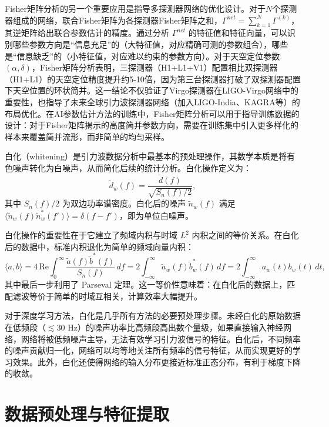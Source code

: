 Fisher矩阵分析的另一个重要应用是指导多探测器网络的优化设计。对于$N$个探测器组成的网络，联合Fisher矩阵为各探测器Fisher矩阵之和，$\Gamma^{net} = \sum_{k=1}^N \Gamma^{(k)}$，其逆矩阵给出联合参数估计的精度。通过分析 $\Gamma^{net}$ 的特征值和特征向量，可以识别哪些参数方向是“信息充足”的（大特征值，对应精确可测的参数组合），哪些是“信息缺乏”的（小特征值，对应难以约束的参数方向）。对于天空定位参数 $(\alpha, \delta)$，Fisher矩阵分析表明，三探测器（H1+L1+V1）配置相比双探测器（H1+L1）的天空定位精度提升约5-10倍，因为第三台探测器打破了双探测器配置下天空位置的环状简并。这一结论不仅验证了Virgo探测器在LIGO-Virgo网络中的重要性，也指导了未来全球引力波探测器网络（加入LIGO-India、KAGRA等）的布局优化。在AI参数估计方法的训练中，Fisher矩阵分析可以用于指导训练数据的设计：对于Fisher矩阵揭示的高度简并参数方向，需要在训练集中引入更多样化的样本来覆盖简并流形，而非简单的均匀采样。

白化（whitening）是引力波数据分析中最基本的预处理操作，其数学本质是将有色噪声转化为白噪声，从而简化后续的统计分析。白化操作定义为：
\begin{equation}
  \tilde{d}_w(f) = \frac{\tilde{d}(f)}{\sqrt{S_n(f)/2}},
\end{equation}
其中 $S_n(f)/2$ 为双边功率谱密度。白化后的噪声 $\tilde{n}_w(f)$ 满足 $\langle \tilde{n}_w(f) \tilde{n}_w^*(f') \rangle = \delta(f-f')$，即为单位白噪声。

白化操作的重要性在于它建立了频域内积与时域 $L^2$ 内积之间的等价关系。在白化后的数据中，标准内积退化为简单的频域向量内积：
\begin{equation}
  \langle a, b \rangle = 4\,\text{Re}\int_0^\infty \frac{\tilde{a}(f)\tilde{b}^*(f)}{S_n(f)}\,df = 2\int_{-\infty}^{\infty} \tilde{a}_w(f)\tilde{b}_w^*(f)\,df = 2\int_{-\infty}^{\infty} a_w(t)b_w(t)\,dt,
\end{equation}
其中最后一步利用了 Parseval 定理。这一等价性意味着：在白化后的数据上，匹配滤波等价于简单的时域互相关，计算效率大幅提升。

对于深度学习方法，白化是几乎所有方法的必要预处理步骤。未经白化的原始数据在低频段（$\lesssim 30$ Hz）的噪声功率比高频段高出数个量级，如果直接输入神经网络，网络将被低频噪声主导，无法有效学习引力波信号的特征。白化后，不同频率的噪声贡献归一化，网络可以均等地关注所有频率的信号特征，从而实现更好的学习效果。此外，白化还使得网络的输入分布更接近标准正态分布，有利于梯度下降的收敛。

\section{数据预处理与特征提取}

